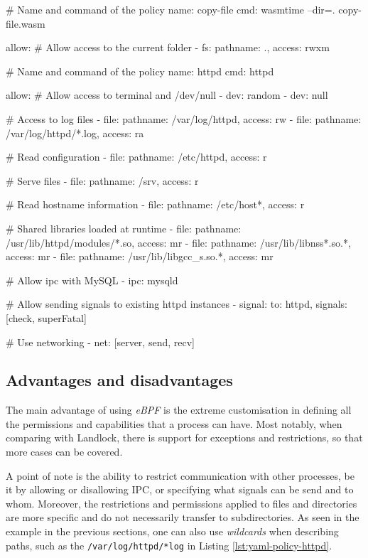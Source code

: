 \begin{code}[language=yaml, caption=Running WASM with BPFContain., label=lst:yaml-policy-wasm]
# Name and command of the policy
name: copy-file
cmd: wasmtime --dir=. copy-file.wasm

allow:
  # Allow access to the current folder
  - fs: {pathname: ., access: rwxm}
\end{code}

\begin{code}[language=yaml, caption=A policy for HTTPD., label=lst:yaml-policy-httpd]
# Name and command of the policy
name: httpd
cmd: httpd

allow:
  # Allow access to terminal and /dev/null
  - dev: random
  - dev: null

  # Access to log files
  - file: {pathname: /var/log/httpd, access: rw}
  - file: {pathname: /var/log/httpd/*.log, access: ra}

  # Read configuration
  - file: {pathname: /etc/httpd, access: r}

  # Serve files
  - file: {pathname: /srv, access: r}

  # Read hostname information
  - file: {pathname: /etc/host*, access: r}

  # Shared libraries loaded at runtime
  - file: {pathname: /usr/lib/httpd/modules/*.so,
           access: mr}
  - file: {pathname: /usr/lib/libnss*.so.*, access: mr}
  - file: {pathname: /usr/lib/libgcc_s.so.*, access: mr}

  # Allow ipc with MySQL
  - ipc: mysqld

 # Allow sending signals to existing httpd instances
  - signal: {to: httpd, signals: [check, superFatal]}

  # Use networking
  - net: [server, send, recv]
\end{code}

\subsection{Advantages and disadvantages}

The main advantage of using \textit{eBPF} is the extreme customisation in defining all the
permissions and capabilities that a process can have. Most notably, when comparing with Landlock,
there is support for exceptions and restrictions, so that more cases can be covered.

A point of note is the ability to restrict communication with other processes, be it by allowing
or disallowing IPC, or specifying what signals can be send and to whom.
Moreover, the restrictions and permissions applied to files and directories are more specific and do not
necessarily transfer to subdirectories. As seen in the example in the previous sections,
one can also use \textit{wildcards} when describing paths, such as the \texttt{/var/log/httpd/*log}
in Listing \ref{lst:yaml-policy-httpd}.


